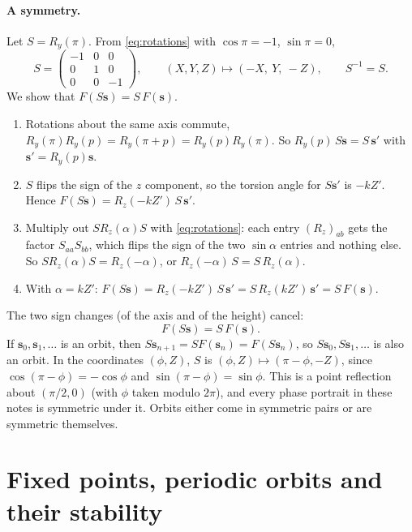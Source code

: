 \documentclass[11pt,a4paper]{article}
\newcommand{\vs}{\bm{s}}
\begin{document}
\paragraph{A symmetry.} Let $S = R_y(\pi)$. From \eqref{eq:rotations} with $\cos\pi = -1$, $\sin\pi = 0$,
\begin{equation*}
  S = \begin{pmatrix}-1&0&0\\0&1&0\\0&0&-1\end{pmatrix}, \qquad (X,Y,Z)\mapsto(-X,\ Y,\ -Z), \qquad S^{-1} = S .
\end{equation*}
We show that $F(S\vs) = S\,F(\vs)$.
\begin{enumerate}
  \item Rotations about the same axis commute, $R_y(\pi)R_y(p) = R_y(\pi+p) = R_y(p)R_y(\pi)$. So $R_y(p)\,S\vs =
  S\,\vs'$ with $\vs' = R_y(p)\vs$.
  \item $S$ flips the sign of the $z$ component, so the torsion angle for $S\vs'$ is $-kZ'$. Hence $F(S\vs) =
  R_z(-kZ')\,S\,\vs'$.
  \item Multiply out $S R_z(\alpha) S$ with \eqref{eq:rotations}: each entry $(R_z)_{ab}$ gets the factor $S_{aa}
  S_{bb}$, which flips the sign of the two $\sin\alpha$ entries and nothing else. So $S R_z(\alpha) S = R_z(-\alpha)$,
  or $R_z(-\alpha)\,S = S\,R_z(\alpha)$.
  \item With $\alpha = kZ'$: $F(S\vs) = R_z(-kZ')\,S\,\vs' = S\,R_z(kZ')\,\vs' = S\,F(\vs)$.
\end{enumerate}
The two sign changes (of the axis and of the height) cancel:
\begin{equation}\label{eq:symmetry}
  F(S\vs) = S\,F(\vs) .
\end{equation}
If $\vs_0, \vs_1, \dots$ is an orbit, then $S\vs_{n+1} = S F(\vs_n) = F(S\vs_n)$, so $S\vs_0, S\vs_1, \dots$ is also an
orbit. In the coordinates $(\phi, Z)$, $S$ is $(\phi, Z)\mapsto(\pi-\phi, -Z)$, since $\cos(\pi-\phi) = -\cos\phi$ and
$\sin(\pi-\phi) = \sin\phi$. This is a point reflection about $(\pi/2, 0)$ (with $\phi$ taken modulo $2\pi$), and every
phase portrait in these notes is symmetric under it. Orbits either come in symmetric pairs or are symmetric
themselves.

\section{Fixed points, periodic orbits and their stability}\label{sec:stability}
\end{document}
